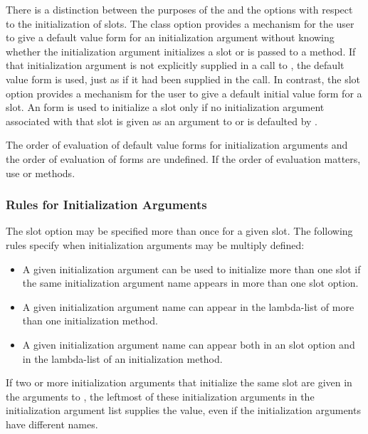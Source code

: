 There is a distinction between the purposes of the 
 and the  options with respect to the
initialization of slots.  The  class option
provides a mechanism for the user to give a default  value form
for an initialization argument without knowing whether the
initialization argument initializes a slot or is passed to a method.
If that initialization argument is not explicitly supplied in a call
to , the default  value form is used, just
as if it had been supplied in the call.  In contrast, the 
 slot option provides a mechanism for the user to give a
default initial value form for a slot.  An  form is
used to initialize a slot only if no initialization argument
associated with that slot is given as an argument to 
 or is defaulted by .

The order of evaluation of default value forms for initialization
arguments and the order of evaluation of  forms are
undefined.  If the order of evaluation matters, use
 or  methods.


\subsubsection{Rules for Initialization Arguments}
\label{Rules-for-Initialization-Arguments-SECTION}

The  slot option may be specified more than
once for a given slot.
The following rules specify when initialization arguments may be
multiply defined:

\begin{itemize}

\item  A given initialization argument can be used to
initialize more than one slot if the same initialization argument name
appears in more than one  slot option.

\item  A given initialization argument name can appear 
in the lambda-list of more than one initialization method.

\item  A given initialization argument name can
appear both in an  slot option and in the lambda-list
of an initialization method.

\end{itemize}

If two or more initialization arguments that initialize
the same slot are given in the arguments to , the
leftmost of these initialization arguments in the initialization
argument list supplies the value, even if the initialization arguments
have different names.

